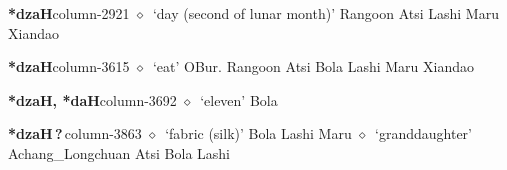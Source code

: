   \item {\footnotesize \textbf{*dzaH}}{\tiny column-2921}
         $\diamond$~`day (second of lunar month)'
         Rangoon 
\hspace{1ex}
         Atsi 
\hspace{1ex}
         Lashi 
\hspace{1ex}
         Maru 
\hspace{1ex}
         Xiandao 
  \item {\footnotesize \textbf{*dzaH}}{\tiny column-3615}
         $\diamond$~`eat'
         OBur. 
\hspace{1ex}
         Rangoon 
\hspace{1ex}
         Atsi 
\hspace{1ex}
         Bola 
\hspace{1ex}
         Lashi 
\hspace{1ex}
         Maru 
\hspace{1ex}
         Xiandao 
  \item {\footnotesize \textbf{*dzaH, *daH}}{\tiny column-3692}
         $\diamond$~`eleven'
         Bola 
  \item {\footnotesize \textbf{*dzaH\,?\,}}{\tiny column-3863}
         $\diamond$~`fabric (silk)'
         Bola 
\hspace{1ex}
         Lashi 
\hspace{1ex}
         Maru 
\hspace{1ex}
         $\diamond$~`granddaughter'
         Achang\_Longchuan 
\hspace{1ex}
         Atsi 
\hspace{1ex}
         Bola 
\hspace{1ex}
         Lashi 
